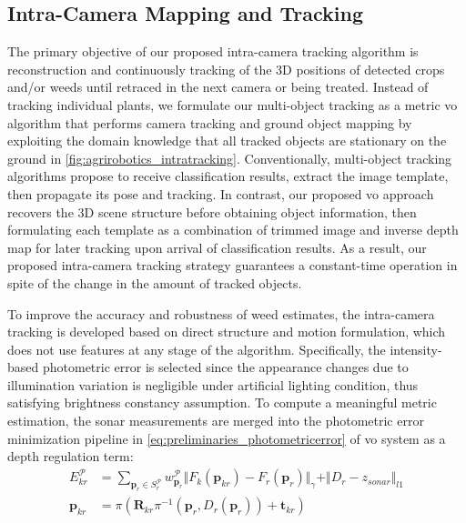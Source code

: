 \subsection{Intra-Camera Mapping and Tracking} 

The primary objective of our proposed intra-camera tracking algorithm is reconstruction and continuously tracking of the 3D positions of detected crops and/or weeds until retraced in the next camera or being treated.
Instead of tracking individual plants, we formulate our multi-object tracking as a metric \acrshort{vo} algorithm that performs camera tracking and ground object mapping by exploiting the domain knowledge that all tracked objects are stationary on the ground in \ref{fig:agrirobotics_intratracking}. 
Conventionally, multi-object tracking algorithms propose to receive classification results, extract the image template, then propagate its pose and tracking. 
In contrast, our proposed \acrshort{vo} approach recovers the 3D scene structure before obtaining object information, then formulating each template as a combination of trimmed image and inverse depth map for later tracking upon arrival of classification results. 
As a result, our proposed intra-camera tracking strategy guarantees a constant-time operation in spite of the change in the amount of tracked objects.

To improve the accuracy and robustness of weed estimates, the intra-camera tracking is developed based on direct structure and motion formulation, which does not use features at any stage of the algorithm.
Specifically, the intensity-based photometric error is selected since the appearance changes due to illumination variation is negligible under artificial lighting condition, thus satisfying brightness constancy assumption. 
To compute a meaningful metric estimation, the sonar measurements are merged into the photometric error minimization pipeline in \ref{eq:preliminaries_photometricerror} of \acrshort{vo} system as a depth regulation term:
\begin{equation} \label{eq:agrirobotics_metricvo}
\begin{split}
E_{kr}^{\mathcal{P}} &= \sum_{\mathbf{p}_r \in \mathit{S}_r^{\mathcal{P}}} w_{\mathbf{p}_r}^{\mathcal{P}} \Vert F_{k} ( \mathbf{p}_{kr}) - F_{r}(\mathbf{p}_r) \Vert_{\gamma} + \Vert D_r - z_{sonar}\Vert_{l1} \\
 \mathbf{p}_{kr} &=  \pi ( \mathbf{R}_{kr}\pi^{-1}(\mathbf{p}_r,D_{r}(\mathbf{p}_r) )+\mathbf{t}_{kr} )
\end{split} 
\end{equation} 

